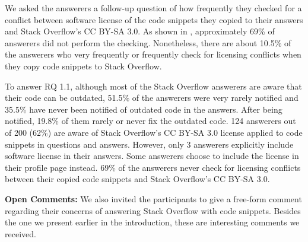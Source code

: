 \documentclass[10pt,journal,compsoc]{IEEEtran}
\newenvironment{boxquote}{\vspace{-1ex}\setlength{\FrameSep}{1\fboxsep}\begin{framed}\setlength{\parskip}{0.5\baselineskip}\setlength{\parindent}{0pt}}{\end{framed}}
\begin{document}
We asked the answerers a follow-up question of how frequently they checked for a
conflict between software license of the code snippets they copied to their
answers and Stack Overflow's CC BY-SA 3.0. As shown in
, approximately 69\% of answerers did not perform
the checking. Nonetheless, there are about 10.5\% of the answerers who very
frequently or frequently check for licensing conflicts when they copy code
snippets to Stack Overflow.


\begin{boxquote}
	To answer RQ 1.1, although most of the Stack Overflow answerers are aware that their code
	can be outdated, 51.5\% of the answerers were very rarely notified and 35.5\% have never been notified of
	outdated code in the answers. After being notified, 19.8\% of them rarely or never fix the outdated code.
	124 answerers out of 200 (62\%) are aware of Stack Overflow's
	CC BY-SA 3.0 license applied to code snippets in questions and answers. However,
	only 3 answerers explicitly include software license in their answers. Some 
	answerers choose to include the license in their profile page instead. 69\% of the
	answerers never check for licensing conflicts between their copied code snippets
	and Stack Overflow's CC BY-SA 3.0.
\end{boxquote}

\textbf{Open Comments:} We also invited the participants to give a
free-form comment regarding their concerns of answering Stack Overflow with code
snippets. Besides the one we present earlier in the introduction, these are
interesting comments we received.
\end{document}
